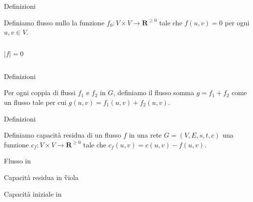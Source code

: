 \begin{frame}{Definizioni}

\vspace{-9pt}
\begin{myboxtitle}
Definiamo \alert{flusso nullo} la funzione 
$f_0: V \times V \rightarrow \mathbf{R}^{\geq 0}$ tale che
$f(u,v) = 0$ per ogni $u,v \in V$.
\end{myboxtitle}

\bigskip
\begin{columns}[T]
\[|f| = 0\]
\vspace{-12pt}
\end{columns}

\end{frame}


\begin{frame}{Definizioni}

\vspace{-9pt}
\begin{myboxtitle}
Per ogni coppia di flussi $f_1$ e $f_2$ in $G$, definiamo il \alert{flusso somma}
$g = f_1+f_2$ come un flusso tale per cui $g(u,v) = f_1(u,v) + f_2(u,v)$.
\end{myboxtitle}


\end{frame}

\begin{frame}{Definizioni}

\vspace{-9pt}
\begin{myboxtitle}
Definiamo \alert{capacità residua} di un flusso $f$ in una rete $G=(V,E,s,t,c)$ 
una funzione $c_f: V \times V \rightarrow \mathbf{R}^{\geq 0}$
tale che $c_f(u,v) = c(u,v) - f(u,v)$.
\end{myboxtitle}

\smallskip
\begin{center}
\end{center}

\BI
\item Flusso in 
\item Capacità residua in \G{viola}
\item Capacità iniziale in 
\EI
\end{frame}


